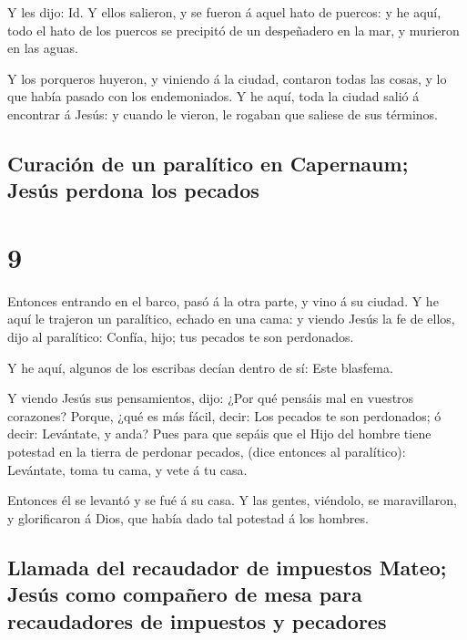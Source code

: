  Y les dijo: Id. Y ellos salieron, y se fueron á aquel
hato de puercos: y he aquí, todo el hato de los puercos se precipitó de
un despeñadero en la mar, y murieron en las aguas.

 Y los porqueros huyeron, y viniendo á la ciudad,
contaron todas las cosas, y lo que había pasado con los endemoniados.
 Y he aquí, toda la ciudad salió á encontrar á Jesús: y
cuando le vieron, le rogaban que saliese de sus términos.

\hypertarget{curaciuxf3n-de-un-paraluxedtico-en-capernaum-jesuxfas-perdona-los-pecados}{%
\subsection{Curación de un paralítico en Capernaum; Jesús perdona los
pecados}\label{curaciuxf3n-de-un-paraluxedtico-en-capernaum-jesuxfas-perdona-los-pecados}}

\hypertarget{section-8}{%
\section{9}\label{section-8}}

 Entonces entrando en el barco, pasó á la otra parte, y
vino á su ciudad.  Y he aquí le trajeron un paralítico,
echado en una cama: y viendo Jesús la fe de ellos, dijo al paralítico:
Confía, hijo; tus pecados te son perdonados.

 Y he aquí, algunos de los escribas decían dentro de sí:
Este blasfema.

 Y viendo Jesús sus pensamientos, dijo: ¿Por qué pensáis
mal en vuestros corazones?  Porque, ¿qué es más fácil,
decir: Los pecados te son perdonados; ó decir: Levántate, y anda?
 Pues para que sepáis que el Hijo del hombre tiene
potestad en la tierra de perdonar pecados, (dice entonces al
paralítico): Levántate, toma tu cama, y vete á tu casa.

 Entonces él se levantó y se fué á su casa. 
Y las gentes, viéndolo, se maravillaron, y glorificaron á Dios, que
había dado tal potestad á los hombres.

\hypertarget{llamada-del-recaudador-de-impuestos-mateo-jesuxfas-como-compauxf1ero-de-mesa-para-recaudadores-de-impuestos-y-pecadores}{%
\subsection{Llamada del recaudador de impuestos Mateo; Jesús como
compañero de mesa para recaudadores de impuestos y
pecadores}\label{llamada-del-recaudador-de-impuestos-mateo-jesuxfas-como-compauxf1ero-de-mesa-para-recaudadores-de-impuestos-y-pecadores}}

